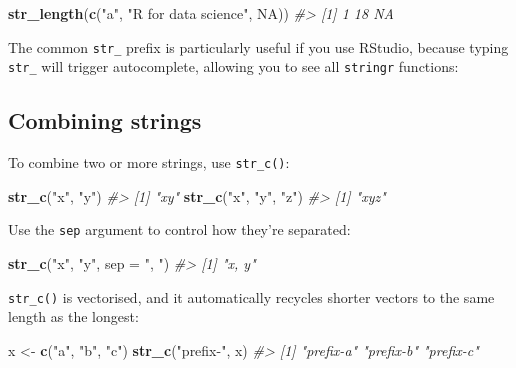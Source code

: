 \documentclass[]{book}
\newenvironment{Shaded}{\begin{snugshade}}{\end{snugshade}}
\newcommand{\CommentTok}[1]{\textcolor[rgb]{0.56,0.35,0.01}{\textit{#1}}}
\newcommand{\DataTypeTok}[1]{\textcolor[rgb]{0.13,0.29,0.53}{#1}}
\newcommand{\KeywordTok}[1]{\textcolor[rgb]{0.13,0.29,0.53}{\textbf{#1}}}
\newcommand{\NormalTok}[1]{#1}
\newcommand{\OtherTok}[1]{\textcolor[rgb]{0.56,0.35,0.01}{#1}}
\newcommand{\StringTok}[1]{\textcolor[rgb]{0.31,0.60,0.02}{#1}}
\begin{document}
\begin{Shaded}
\begin{Highlighting}[]
\KeywordTok{str_length}\NormalTok{(}\KeywordTok{c}\NormalTok{(}\StringTok{"a"}\NormalTok{, }\StringTok{"R for data science"}\NormalTok{, }\OtherTok{NA}\NormalTok{))}
\CommentTok{#> [1]  1 18 NA}
\end{Highlighting}
\end{Shaded}

The common \texttt{str\_} prefix is particularly useful if you use RStudio, because typing \texttt{str\_} will trigger autocomplete, allowing you to see all \texttt{stringr} functions:

\hypertarget{combining-strings}{%
\subsection{Combining strings}\label{combining-strings}}

To combine two or more strings, use \texttt{str\_c()}:

\begin{Shaded}
\begin{Highlighting}[]
\KeywordTok{str_c}\NormalTok{(}\StringTok{"x"}\NormalTok{, }\StringTok{"y"}\NormalTok{)}
\CommentTok{#> [1] "xy"}
\KeywordTok{str_c}\NormalTok{(}\StringTok{"x"}\NormalTok{, }\StringTok{"y"}\NormalTok{, }\StringTok{"z"}\NormalTok{)}
\CommentTok{#> [1] "xyz"}
\end{Highlighting}
\end{Shaded}

Use the \texttt{sep} argument to control how they're separated:

\begin{Shaded}
\begin{Highlighting}[]
\KeywordTok{str_c}\NormalTok{(}\StringTok{"x"}\NormalTok{, }\StringTok{"y"}\NormalTok{, }\DataTypeTok{sep =} \StringTok{", "}\NormalTok{)}
\CommentTok{#> [1] "x, y"}
\end{Highlighting}
\end{Shaded}

\texttt{str\_c()} is vectorised, and it automatically recycles shorter vectors to the same length as the longest:

\begin{Shaded}
\begin{Highlighting}[]
\NormalTok{x <-}\StringTok{ }\KeywordTok{c}\NormalTok{(}\StringTok{"a"}\NormalTok{, }\StringTok{"b"}\NormalTok{, }\StringTok{"c"}\NormalTok{)}
\KeywordTok{str_c}\NormalTok{(}\StringTok{"prefix-"}\NormalTok{, x)}
\CommentTok{#> [1] "prefix-a" "prefix-b" "prefix-c"}
\end{Highlighting}
\end{Shaded}
\end{document}
